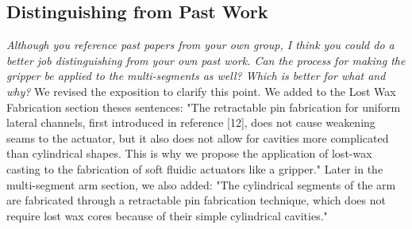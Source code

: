 \documentclass[letterpaper, 10 pt, twocolumn, conference]{article}
\begin{document}
\subsection{Distinguishing from Past Work}
\textit{Although you reference past papers from your own group, I think you could do a better job distinguishing from your own past work. Can the process for making the gripper be applied to the multi-segments as well? Which is better for what and why?}
%
We revised the exposition to clarify this point. We added to the Lost Wax Fabrication section theses sentences:
"The retractable pin fabrication for uniform lateral channels, first introduced in reference [12], does not cause weakening seams to the actuator, but it also does not allow for cavities more complicated than cylindrical shapes. This is why we propose the application of lost-wax casting to the fabrication of soft fluidic actuators like a gripper."
Later in the multi-segment arm section, we also added:
"The cylindrical segments of the arm are fabricated through a retractable pin fabrication technique, which does not require lost wax cores because of their simple cylindrical cavities."
%
\end{document}
